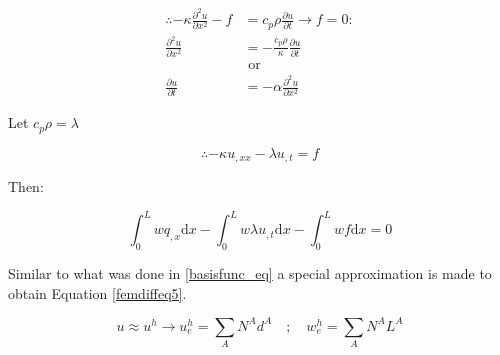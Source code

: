 \begin{equation}\label{femdiffeq2}
\begin{aligned}
\therefore -\kappa \frac{\partial^2 u}{\partial x^2} - f &= c_p\rho \frac{\partial u}{\partial t} \rightarrow f=0:\\
\frac{\partial^2 u}{\partial x^2} &= - \frac{c_p\rho}{\kappa} \frac{\partial u}{\partial t} \quad \\
&\text{ or } \\
\frac{\partial u}{\partial t} &= -\alpha \frac{\partial^2 u}{\partial x^2}
\end{aligned}
\end{equation}


Let $c_p \rho = \lambda$ 

\begin{equation}\label{femdiffeq3}
\therefore -\kappa u_{,xx} - \lambda u_{,t} = f
\end{equation}


Then:

\begin{equation}\label{femdiffeq4}
\int_0^L w q_{,x} \text{d}x - \int_0^L w \lambda u_{,t} \text{d}x - \int_0^L w f \text{d}x = 0
\end{equation}


Similar to what was done in \ref{basisfunc_eq} a special approximation is made to obtain Equation \ref{femdiffeq5}.

\begin{equation}\label{femdiffeq5}
u \approx u^h \rightarrow u_e^h = \sum_{A}N^A d^A \quad;\quad w_e^h = \sum_{A}N^A L^A
\end{equation}


%
%
%
%
%
%
%


